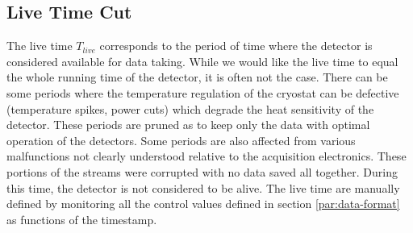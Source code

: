 

\subsection{Live Time Cut}
\label{par:live-time-cut}

%
%
%

The live time $T_{live}$ corresponds to the period of time where the detector is considered available for data taking. While we would like the live time to equal the whole running time of the detector, it is often not the case. There can be some periods where the temperature regulation of the cryostat can be defective (temperature spikes, power cuts) which degrade the heat sensitivity of the detector. These periods are pruned as to keep only the data with optimal operation of the detectors. Some periods are also affected from various malfunctions not clearly understood relative to the acquisition electronics. These portions of the streams were corrupted with no data saved all together. During this time, the detector is not considered to be alive. The live time are manually defined by monitoring all the control values defined in section \ref{par:data-format} as functions of the timestamp.

